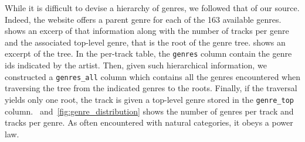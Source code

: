 \documentclass{article}
\begin{document}
While it is difficult to devise a hierarchy of genres, we followed that of our source. Indeed, the website offers a parent genre for each of the 163 available genres.  shows an excerp of that information along with the number of tracks per genre and the associated top-level genre, that is the root of the genre tree.  shows an excerpt of the tree.
In the per-track table, the \texttt{genres} column contain the genre ids indicated by the artist. Then, given such hierarchical information, we constructed a \texttt{genres\_all} column which contains all the genres encountered when traversing the tree from the indicated genres to the roots. Finally, if the traversal yields only one root, the track is given a top-level genre stored in the \texttt{genre\_top} column.
~and~\ref{fig:genre_distribution} shows the number of genres per track and tracks per genre. As often encountered with natural categories, it obeys a power law.
 
\end{document}
